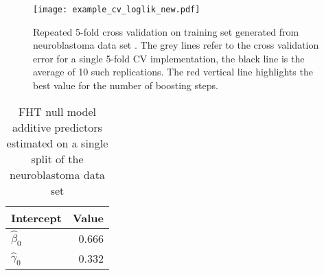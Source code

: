 \begin{figure}
\caption{
    Repeated 5-fold cross validation on training set generated from neuroblastoma data set \citep{oberthuer-data}.
    The grey lines refer to the cross validation error for a single 5-fold CV implementation,
    the black line is the average of 10 such replications.
    The red vertical line highlights the best value for the number of boosting steps.
}
\label{fig:neuroblastoma-cv}
\centering\texttt{[image: example\_cv\_loglik\_new.pdf]}
\end{figure}



\begin{table}
\caption{FHT null model additive predictors estimated on a single split of the neuroblastoma data set \citep{oberthuer-data}}
\label{tab:neuroblastoma-intercepts}
\centering
\begin{tabular}{lr}
\toprule
Intercept  & Value\\
\hline
$\hat{\beta}_0$  & 0.666 \\
$\hat{\gamma}_0$ & 0.332 \\
\bottomrule
\end{tabular}
\end{table}

